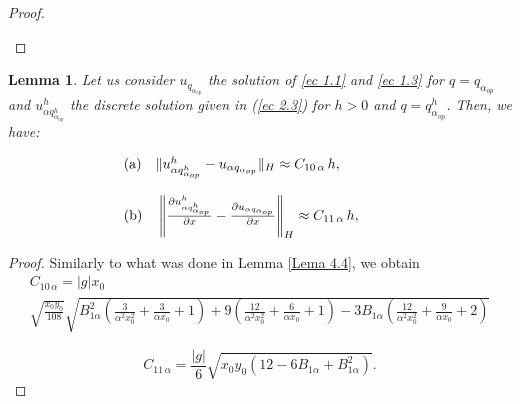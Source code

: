 \documentclass[11pt]{article}
\newcommand\pder[2][]{\ensuremath{\tfrac{\partial#1}{\partial#2}}}
\newtheorem{Lemma}{Lemma}
\begin{document}
\begin{proof}
\begin{itemize}
    \end{itemize}
    \end{proof}


\begin{Lemma} Let us consider $u_{q_{\alpha_{op}}}$ the solution of \eqref{ec 1.1} and \eqref{ec 1.3} for $q= q_{\alpha_{op}}$ and ${u^h_{\alpha q^h_{\alpha_{op}}}}$ the discrete solution  given in (\ref{ec 2.3}) for  $h>0$ and $q={ q^h_{\alpha_{op}}}$. Then, we have:
						
	 \begin{equation}\begin{array}{ll} \label{difu-problema2alpha} {\rm (a)} \quad  			      
  				  \lVert {u^h_{\alpha q^h_{\alpha_{op}}}} - u_{\alpha q_{\alpha_{op}}}  \rVert _H \approx C_{10\,\alpha}\, h,
  \qquad \qquad \\
  \\
     {\rm (b)}\quad
        \left\lVert \pder[{u^h_{\alpha q^h_{\alpha_{op}}}}]{x} - \pder[u_{\alpha q_{\alpha_{op}}}]{x} \right\rVert _H \approx C_{11\, \alpha} \,h,
        \end{array}
\end{equation}
   \end{Lemma}
   
   \begin{proof} Similarly to what was done in Lemma \ref{Lema 4.4}, we obtain
   $$\begin{array}{ll}
   C_{10\, \alpha}=|g|x_0\\
    \sqrt{\tfrac{x_0 y_0}{108}} \sqrt{B_{1\alpha}^2 \left( \tfrac{3}{\alpha^2 x_0^2}+\tfrac{3}{\alpha x_0}+1\right)+9\left(\tfrac{12}{\alpha^2 x_0^2}+\tfrac{6}{\alpha x_0}+1 \right)-3B_{1\alpha}\left( \tfrac{12}{\alpha^2 x_0^2}+\tfrac{9}{\alpha x_0}+2\right)}\end{array}$$
   
   
      $$C_{11\, \alpha}=\frac{|g|}{6} \sqrt{ x_0 y_0 (12-6B_{1\alpha}+B_{1\alpha}^2)}.$$
   \end{proof}
   
\end{document}
